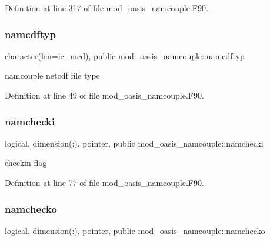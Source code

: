 Definition at line 317 of file mod\+\_\+oasis\+\_\+namcouple.\+F90.

\mbox{\label{namespacemod__oasis__namcouple_a6fc58f1e9018344a1d5f99e6767d1bda}} 
\subsubsection{\texorpdfstring{namcdftyp}{namcdftyp}}
{\footnotesize\ttfamily character(len=ic\+\_\+med), public mod\+\_\+oasis\+\_\+namcouple\+::namcdftyp}



namcouple netcdf file type 



Definition at line 49 of file mod\+\_\+oasis\+\_\+namcouple.\+F90.

\mbox{\label{namespacemod__oasis__namcouple_a7c88a329c97aea020e9b135bdca8d160}} 
\subsubsection{\texorpdfstring{namchecki}{namchecki}}
{\footnotesize\ttfamily logical, dimension(\+:), pointer, public mod\+\_\+oasis\+\_\+namcouple\+::namchecki}



checkin flag 



Definition at line 77 of file mod\+\_\+oasis\+\_\+namcouple.\+F90.

\mbox{\label{namespacemod__oasis__namcouple_a58c011820e55c9af9f306fbb1d45eb23}} 
\subsubsection{\texorpdfstring{namchecko}{namchecko}}
{\footnotesize\ttfamily logical, dimension(\+:), pointer, public mod\+\_\+oasis\+\_\+namcouple\+::namchecko}




